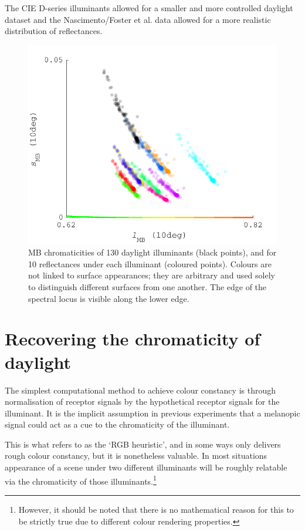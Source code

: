 The CIE D-series illuminants allowed for a smaller and more controlled daylight dataset and the Nascimento/Foster et al. data allowed for a more realistic distribution of reflectances.

\begin{figure}[htbp]
    \includegraphics[max width=\textwidth]{figs/comp/predictingChromaticity/BasicMB_2.pdf}
    \caption{\gls{MB} chromaticities of 130 daylight illuminants (black points), and for 10 reflectances under each illuminant (coloured points). Colours are not linked to surface appearances; they are arbitrary and used solely to distinguish different surfaces from one another. The edge of the spectral locus is visible along the lower edge.}
    \label{fig:MB}
\end{figure} 


\section{Recovering the chromaticity of daylight}

The simplest computational method to achieve colour constancy is through normalisation of receptor signals by the hypothetical receptor signals for the illuminant. It is the implicit assumption in previous experiments that a melanopic signal could act as a cue to the chromaticity of the illuminant.

This is what \citet{maloney_physics-based_2001} refers to as the `RGB heuristic', and in some ways only delivers rough colour constancy, but it is nonetheless valuable. In most situations appearance of a scene under two different illuminants will be roughly relatable via the chromaticity of those illuminants.\footnote{However, it should be noted that there is no mathematical reason for this to be strictly true due to different colour rendering properties.}


